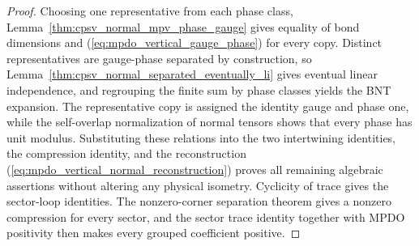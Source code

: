 \begin{proof}\leanok
    Choosing one representative from each phase class,
    Lemma~\ref{thm:cpsv_normal_mpv_phase_gauge} gives equality of bond
    dimensions and (\ref{eq:mpdo_vertical_gauge_phase}) for every copy.
    Distinct representatives are gauge-phase separated by construction, so
    Lemma~\ref{thm:cpsv_normal_separated_eventually_li} gives eventual linear
    independence, and regrouping the finite sum by phase classes yields the BNT
    expansion. The representative copy is assigned the identity gauge and
    phase one, while the self-overlap normalization of normal tensors shows
    that every phase has unit modulus. Substituting these relations into the two intertwining
    identities, the compression identity, and the reconstruction
    (\ref{eq:mpdo_vertical_normal_reconstruction}) proves all remaining
    algebraic assertions without altering any physical isometry. Cyclicity of
    trace gives the sector-loop identities. The nonzero-corner separation
    theorem gives a nonzero compression for every sector, and the sector
    trace identity together with MPDO positivity then makes every grouped coefficient
    positive.
\end{proof}

